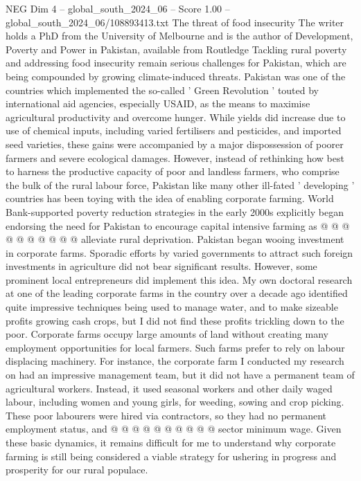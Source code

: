 \begin{textsample}{NEG Dim 4 – global\_south\_2024\_06 – Score 1.00 – global\_south\_2024\_06/108893413.txt}  \label{ex:f4_neg_378}
The threat of food insecurity The writer holds a PhD from the University of Melbourne and is the author of Development, Poverty and Power in Pakistan, available from Routledge Tackling rural poverty and addressing food insecurity remain serious challenges for Pakistan, which are being compounded by growing climate-induced threats.
Pakistan was one of the countries which implemented the so-called ' Green Revolution ' touted by international aid agencies, especially USAID, as the means to maximise agricultural productivity and overcome hunger.
While yields did increase due to use of chemical inputs, including varied fertilisers and pesticides, and imported seed varieties, these gains were accompanied by a major dispossession of poorer farmers and severe ecological damages.
However, instead of rethinking how best to harness the productive capacity of poor and landless farmers, who comprise the bulk of the rural labour force, Pakistan like many other ill-fated ' developing ' countries has been toying with the idea of enabling corporate farming.
World Bank-supported poverty reduction strategies in the early 2000s explicitly began endorsing the need for Pakistan to encourage capital intensive farming as @ @ @ @ @ @ @ @ @ @ alleviate rural deprivation.
Pakistan began wooing investment in corporate farms.
Sporadic efforts by varied governments to attract such foreign investments in agriculture did not bear significant results.
However, some prominent local entrepreneurs did implement this idea.
My own doctoral research at one of the leading corporate farms in the country over a decade ago identified quite impressive techniques being used to manage water, and to make sizeable profits growing cash crops, but I did not find these profits trickling down to the poor.
Corporate farms occupy large amounts of land without creating many employment opportunities for local farmers.
Such farms prefer to rely on labour displacing machinery.
For instance, the corporate farm I conducted my research on had an impressive management team, but it did not have a permanent team of agricultural workers.
Instead, it used seasonal workers and other daily waged labour, including women and young girls, for weeding, sowing and crop picking.
These poor labourers were hired via contractors, so they had no permanent employment status, and @ @ @ @ @ @ @ @ @ @ sector minimum wage.
Given these basic dynamics, it remains difficult for me to understand why corporate farming is still being considered a viable strategy for ushering in progress and prosperity for our rural populace.

\end{textsample}
